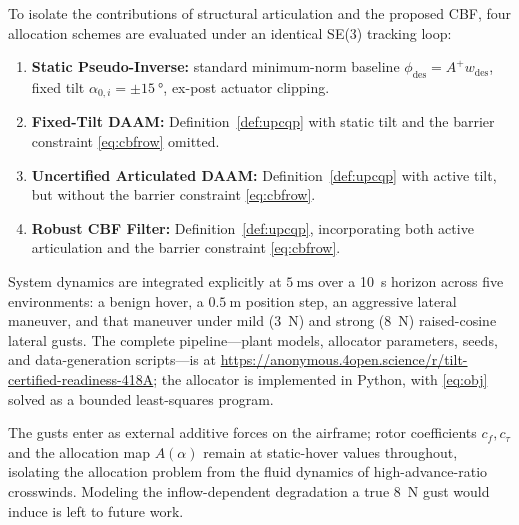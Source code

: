 \documentclass[letter, 10 pt, journal, twoside]{IEEEtran}
\theoremstyle{compact}
\newcommand{\coderepo}{{\url{https://anonymous.4open.science/r/tilt-certified-readiness-418A}}}
\begin{document}
To isolate the contributions of structural articulation and the proposed \ac{CBF}, four allocation schemes are evaluated under an identical SE(3) tracking loop:
\begin{enumerate}\itemsep1pt \parskip0pt 
    \item \textbf{Static Pseudo-Inverse:} standard minimum-norm baseline \cite{Johansen2013} $\phi_{\mathrm{des}}=A^{+}w_{\mathrm{des}}$, fixed tilt $\alpha_{0,i}=\pm\SI{15}{\degree}$, ex-post actuator clipping.
    \item \textbf{Fixed-Tilt \ac{DAAM}:} Definition~\ref{def:upcqp} with static tilt and the barrier constraint \eqref{eq:cbfrow} omitted.
    \item \textbf{Uncertified Articulated \ac{DAAM}:} Definition~\ref{def:upcqp} with active tilt, but without the barrier constraint \eqref{eq:cbfrow}.
    \item \textbf{Robust CBF Filter:} Definition~\ref{def:upcqp}, incorporating both active articulation and the barrier constraint \eqref{eq:cbfrow}.
\end{enumerate}

System dynamics are integrated explicitly at $\SI{5}{\milli\second}$ over a \SI{10}{\second} horizon across five environments: a benign hover, a $\SI{0.5}{\metre}$ position step, an aggressive lateral maneuver, and that maneuver under mild (\SI{3}{\newton}) and strong (\SI{8}{\newton}) raised-cosine lateral gusts. The complete pipeline---plant models, allocator parameters, seeds, and data-generation scripts---is at \coderepo; the allocator is implemented in Python, with \eqref{eq:obj} solved as a bounded least-squares program.

The gusts enter as external additive forces on the airframe; rotor coefficients $c_f, c_\tau$ and the allocation map $A(\alpha)$ remain at static-hover values throughout, isolating the allocation problem from the fluid dynamics of high-advance-ratio crosswinds. Modeling the inflow-dependent degradation a true \SI{8}{\newton} gust would induce is left to future work.
\end{document}
